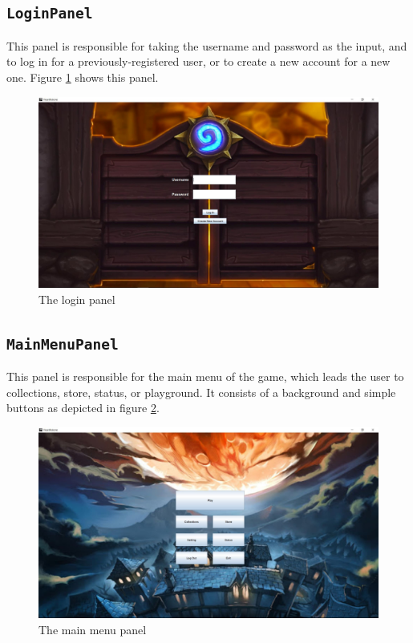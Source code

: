 \documentclass[a4paper]{article}
\begin{document}
\subsection{\texttt{LoginPanel}}
This panel is responsible for taking the username and password as the input, and to log in for a previously-registered user, or to create a new account for a new one. Figure \ref{loginPanel} shows this panel.

\begin{figure}[h!]
	\centering
	\includegraphics[scale=0.4]{loginPanel.JPG}
	\caption{The login panel}
	\label{loginPanel}
\end{figure}

\subsection{\texttt{MainMenuPanel}}
This panel is responsible for the main menu of the game, which leads the user to collections, store, status, or playground. It consists of a background and simple buttons as depicted in figure \ref{mainmenu}.
\begin{figure}[h!]
	\centering
	\includegraphics[scale=0.4]{mainmenuPanel.JPG}
	\caption{The main menu panel}
	\label{mainmenu}
\end{figure}
\end{document}
